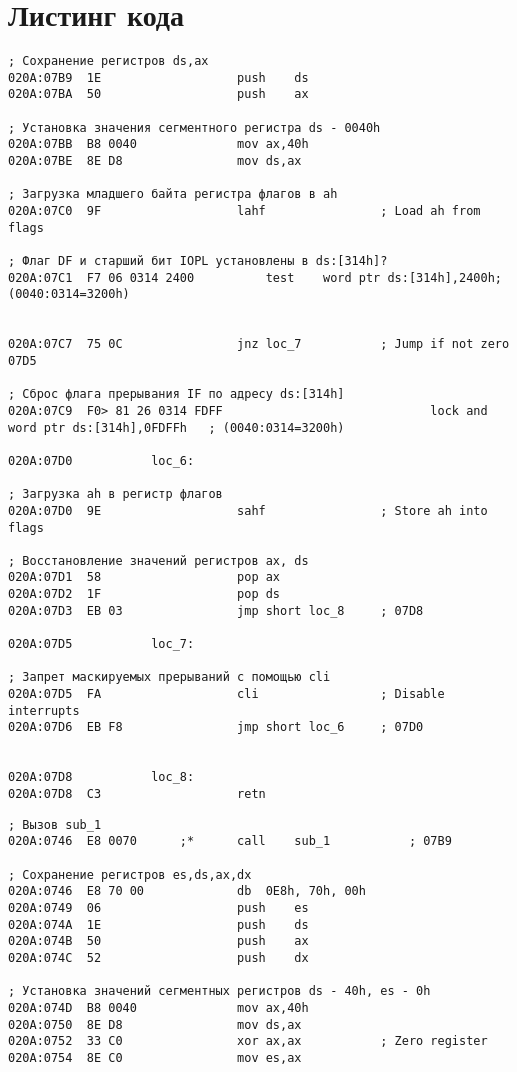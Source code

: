 \chapter{Листинг кода}
\begin{center}

\begin{lstlisting}[style={asm}, caption= sub\_1]
; Сохранение регистров ds,ax
020A:07B9  1E					push	ds
020A:07BA  50					push	ax

; Установка значения сегментного регистра ds - 0040h
020A:07BB  B8 0040				mov	ax,40h
020A:07BE  8E D8				mov	ds,ax

; Загрузка младшего байта регистра флагов в ah
020A:07C0  9F					lahf				; Load ah from flags

; Флаг DF и старший бит IOPL установлены в ds:[314h]?
020A:07C1  F7 06 0314 2400			test	word ptr ds:[314h],2400h; (0040:0314=3200h)


020A:07C7  75 0C				jnz	loc_7			; Jump if not zero 07D5

; Сброс флага прерывания IF по адресу ds:[314h]
020A:07C9  F0> 81 26 0314 FDFF	                           lock	and	word ptr ds:[314h],0FDFFh	; (0040:0314=3200h)

020A:07D0			loc_6:

; Загрузка ah в регистр флагов
020A:07D0  9E					sahf				; Store ah into flags

; Восстановление значений регистров ax, ds
020A:07D1  58					pop	ax
020A:07D2  1F					pop	ds
020A:07D3  EB 03				jmp	short loc_8		; 07D8

020A:07D5			loc_7:

; Запрет маскируемых прерываний с помощью cli
020A:07D5  FA					cli				    ; Disable interrupts
020A:07D6  EB F8				jmp	short loc_6		; 07D0


020A:07D8			loc_8:
020A:07D8  C3					retn
\end{lstlisting}
\pagebreak

\begin{lstlisting}[style={asm}, caption = Прерывание int 8h]
; Вызов sub_1
020A:0746  E8 0070		;*		call	sub_1			; 07B9

; Сохранение регистров es,ds,ax,dx
020A:0746  E8 70 00				db	0E8h, 70h, 00h
020A:0749  06					push	es
020A:074A  1E					push	ds
020A:074B  50					push	ax
020A:074C  52					push	dx

; Установка значений сегментных регистров ds - 40h, es - 0h
020A:074D  B8 0040				mov	ax,40h
020A:0750  8E D8				mov	ds,ax
020A:0752  33 C0				xor	ax,ax			; Zero register
020A:0754  8E C0				mov	es,ax


\end{lstlisting}
\end{center}
